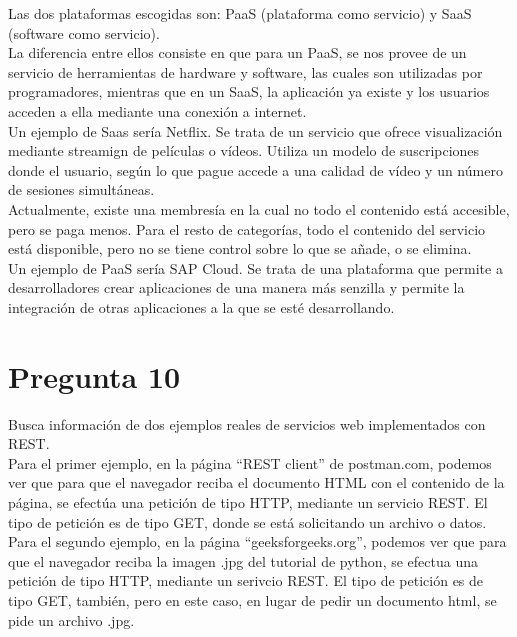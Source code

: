 \documentclass[spanish]{article}
\begin{document}
Las dos plataformas escogidas son: PaaS (plataforma como
servicio) y SaaS (software como servicio).\\

La diferencia entre ellos consiste en que para un PaaS, se
nos provee de un servicio de herramientas de hardware y
software, las cuales son utilizadas por programadores,
mientras que en un SaaS, la aplicación ya existe y los
usuarios acceden a ella mediante una conexión a internet.\\

Un ejemplo de Saas sería Netflix. Se trata de un servicio
que ofrece visualización mediante streamign de películas o
vídeos. Utiliza un modelo de suscripciones donde el usuario,
según lo que pague accede a una calidad de vídeo y un número
de sesiones simultáneas.\\

Actualmente, existe una membresía en la cual no todo el
contenido está accesible, pero se paga menos. Para el resto
de categorías, todo el contenido del servicio está
disponible, pero no se tiene control sobre lo que se añade,
o se elimina.\\

Un ejemplo de PaaS sería SAP Cloud. Se trata de una
plataforma que permite a desarrolladores crear aplicaciones
de una manera más senzilla y permite la integración de otras
aplicaciones a la que se esté desarrollando.

\newpage

\section{Pregunta 10}

Busca información de dos ejemplos reales de servicios web
implementados con REST.\\

Para el primer ejemplo, en la página ``REST client'' de
postman.com, podemos ver que para que el navegador reciba el
documento HTML con el contenido de la página, se efectúa una
petición de tipo HTTP, mediante un servicio REST. El tipo de
petición es de tipo GET, donde se está solicitando un
archivo o datos.\\

Para el segundo ejemplo, en la página ``geeksforgeeks.org'',
podemos ver que para que el navegador reciba la imagen .jpg
del tutorial de python, se efectua una petición de tipo
HTTP, mediante un serivcio REST. El tipo de petición es de
tipo GET, también, pero en este caso, en lugar de pedir un
documento html, se pide un archivo .jpg.
\end{document}
